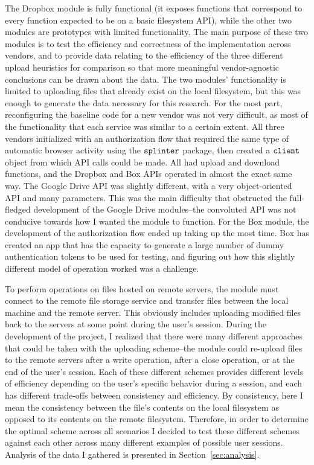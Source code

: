 \documentclass[pageno]{jpaper}
\begin{document}
The Dropbox module is fully functional (it exposes functions that correspond to every function expected to be on a basic filesystem API), while the other two modules are prototypes with limited functionality. The main purpose of these two modules is to test the efficiency and correctness of the implementation across vendors, and to provide data relating to the efficiency of the three different upload heuristics for comparison so that more meaningful vendor-agnostic conclusions can be drawn about the data. The two modules' functionality is limited to uploading files that already exist on the local filesystem, but this was enough to generate the data necessary for this research. For the most part, reconfiguring the baseline code for a new vendor was not very difficult, as most of the functionality that each service was similar to a certain extent. All three vendors initialized with an authorization flow that required the same type of automatic browser activity using the $\tt{splinter}$ package, then created a $\tt{client}$ object from which API calls could be made. All had upload and download functions, and the Dropbox and Box APIs operated in almost the exact same way. The Google Drive API was slightly different, with a very object-oriented API and many parameters. This was the main difficulty that obstructed the full-fledged development of the Google Drive modules--the convoluted API was not conducive towards how I wanted the module to function. For the Box module, the development of the authorization flow ended up taking up the most time. Box has created an app that has the capacity to generate a large number of dummy authentication tokens to be used for testing, and figuring out how this slightly different model of operation worked was a challenge.

To perform operations on files hosted on remote servers, the module must connect to the remote file storage service and transfer files between the local machine and the remote server. This obviously includes uploading modified files back to the servers at some point during the user's session. During the development of the project, I realized that there were many different approaches that could be taken with the uploading scheme--the module could re-upload files to the remote servers after a write operation, after a close operation, or at the end of the user's session. Each of these different schemes provides different levels of efficiency depending on the user's specific behavior during a session, and each has different trade-offs between consistency and efficiency. By consistency, here I mean the consistency between the file's contents on the local filesystem as opposed to its contents on the remote filesystem. Therefore, in order to determine the optimal scheme across all scenarios I decided to test these different schemes against each other across many different examples of possible user sessions. Analysis of the data I gathered is presented in Section~\ref{sec:analysis}. 
\end{document}
